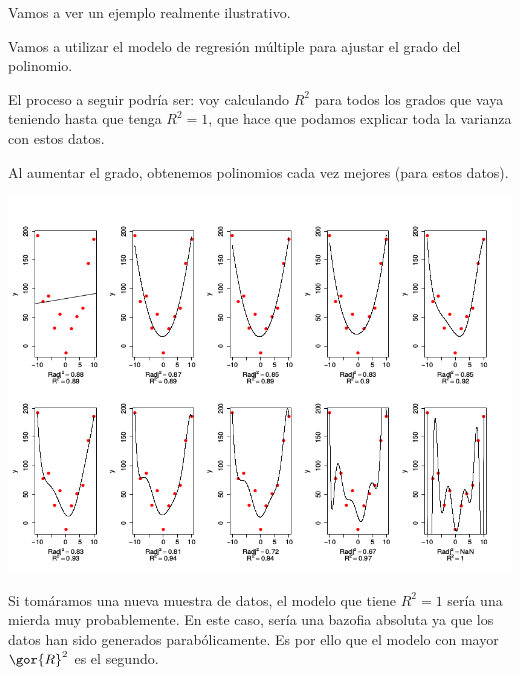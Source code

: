 Vamos a ver un ejemplo realmente ilustrativo.
\begin{example}

Vamos a utilizar el modelo de regresión múltiple para ajustar el grado del polinomio.

El proceso a seguir podría ser: voy calculando $R^2$ para todos los grados que vaya teniendo hasta que tenga $R^2 = 1$, que hace que podamos explicar toda la varianza con estos datos. 


Al aumentar el grado, obtenemos polinomios cada vez mejores (para estos datos).

\begin{center}
\includegraphics[scale=0.45]{img/RvsRAdj.png}
\end{center}

Si tomáramos una nueva muestra de datos, el modelo que tiene $R^2=1$ sería una mierda muy probablemente. En este caso, sería una bazofia absoluta ya que los datos han sido generados parabólicamente. Es por ello que el modelo con mayor $\gor{R}^2$ es el segundo.

\end{example}


